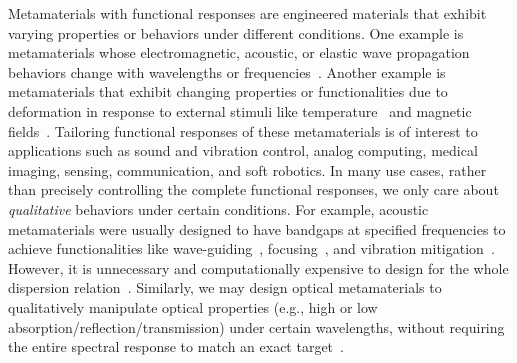 \documentclass{article}
\begin{document}
Metamaterials with functional responses are engineered materials that exhibit varying properties or behaviors under different conditions. One example is metamaterials whose electromagnetic, acoustic, or elastic wave propagation behaviors change with wavelengths or frequencies~\cite{jiang2022flexible}. Another example is metamaterials that exhibit changing properties or functionalities due to deformation in response to external stimuli like temperature~\cite{boley2019shape} and magnetic fields~\cite{ma2022deep}.
Tailoring functional responses of these metamaterials is of interest to applications such as sound and vibration control, analog computing, medical imaging, sensing, communication, and soft robotics. In many use cases, rather than precisely controlling the complete functional responses, we only care about \textit{qualitative} behaviors under certain conditions. For example, acoustic metamaterials were usually designed to have bandgaps at specified frequencies to achieve functionalities like wave-guiding~\cite{casadei_piezoelectric_2012,liu2020acoustic}, focusing~\cite{kim2021poroelastic,xie2018acoustic}, and vibration mitigation~\cite{matlack2016composite,krodel2015wide,bayat2018wave}. However, it is unnecessary and computationally expensive to design for the whole dispersion relation~\cite{ronellenfitsch2019inverse,goh2020inverse,li2020designing,zhang2021realization,chen2022see}. Similarly, we may design optical metamaterials to qualitatively manipulate optical properties (e.g., high or low absorption/reflection/transmission) under certain wavelengths, without requiring the entire spectral response to match an exact target~\cite{vismara2019solar,cheng2021plasmonic}.
\end{document}
